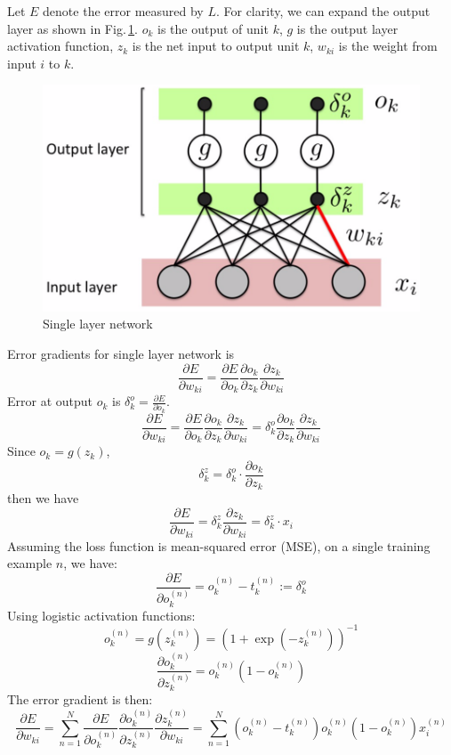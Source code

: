  Let $E$ denote the error measured by $L$. For clarity, we can expand the output layer as shown in Fig.\,\ref{expand2}. $o_k$ is the output of unit $k$, $g$ is the output layer activation function, $z_{k}$ is the net input to output unit $k$, $w_{ki}$ is the weight from input $i$ to $k$. 
\begin{figure}[h]
	\centering
	\includegraphics[scale=0.5]{Figs/singlelayer2.png}
    \caption{Single layer network}
    \label{expand2}
\end{figure}
Error gradients for single layer network is 
$$\frac{\partial E}{\partial w_{ki}} = 
    \frac{\partial E}{\partial o_{k}} 
    \frac{\partial o_{k}}{\partial z_{k}} 
    \frac{\partial z_{k}}{\partial w_{ki}} $$
Error at output $o_k$ is $\delta_k^o =  \frac{\partial E}{\partial o_{k}} $.
$$\frac{\partial E}{\partial w_{ki}} = 
    \frac{\partial E}{\partial o_{k}} 
    \frac{\partial o_{k}}{\partial z_{k}} 
    \frac{\partial z_{k}}{\partial w_{ki}} 
    =  
    \delta_k^o 
    \frac{\partial o_{k}}{\partial z_{k}} 
    \frac{\partial z_{k}}{\partial w_{ki}}  $$
Since $o_k = g(z_k)$, $$\delta_k^z = \delta_k^o \cdot \frac{\partial o_{k}}{\partial z_{k}}$$ then we have $$\frac{\partial E}{\partial w_{ki}} = \delta_k^z \frac{\partial z_{k}}{\partial w_{ki}} =  \delta_k^z \cdot x_i$$ 
Assuming the loss function is mean-squared error (MSE), on a single training example $n$, we have:
$$\frac{\partial E}{\partial o_k^{(n)}} = o_k^{(n)} - t_k^{(n)} := \delta_k^o$$Using logistic activation functions:$$ o_k^{(n)} = g(z_k^{(n)}) = (1 + \exp(-z_k^{(n)}))^{-1}$$
$$\frac{\partial o_k^{(n)}}{\partial z_k^{(n)}} = o_k^{(n)}(1-o_k^{(n)})$$
The error gradient is then:
$$\frac{\partial E}{\partial w_{ki}} =  \sum_{n=1}^N \frac{\partial E}{\partial o_{k}^{(n)}}\frac{\partial o_{k}^{(n)}}{\partial z_{k}^{(n)}} \frac{\partial z_{k}^{(n)}}{\partial w_{ki}} = \sum_{n=1}^N (o_k^{(n)} - t_k^{(n)})o_k^{(n)} (1-o_k^{(n)}) x_i^{(n)}$$
